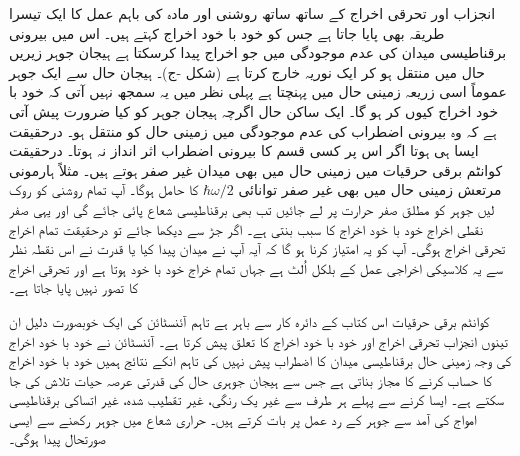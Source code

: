انجزاب اور تحرقی اخراج کے ساتھ ساتھ روشنی اور مادہ کی باہم عمل کا ایک تیسرا طریقہ بھی پایا جاتا ہے جس کو خود با خود اخراج کہتے ہیں۔ اس میں بیرونی برقناطیسی میدان کی عدم موجودگی میں جو اخراج پیدا کرسکتا ہے ہیجان جوہر زیریں حال میں منتقل ہو کر ایک نوریہ خارج کرتا ہے  (شکل -ج)۔ 	ہیجان حال سے ایک جوہر عموماً اسی زریعہ زمینی حال میں پہنچتا ہے پہلی نظر میں یہ سمجھ نہیں آتی کہ خود با خود اخراج کیوں کر ہو گا۔ ایک ساکن حال اگرچہ ہیجان جوہر کو کیا ضرورت پیش آتی ہے کہ وہ بیرونی اضطراب کی عدم موجودگی میں زمینی حال کو منتقل ہو۔ درحقیقت ایسا ہی ہوتا اگر اس پر کسی قسم کا بیرونی اضطراب اثر انداز نہ ہوتا۔ درحقیقت کوانٹم برقی حرقیات میں زمینی حال میں بھی میدان غیر صفر ہوتے ہیں۔ مثلاً ہارمونی مرتعش زمینی حال میں بھی غیر صفر توانائی \(\hbar\omega/2\) کا حامل ہوگا۔ آپ تمام روشنی کو روک لیں جوہر کو مطلق صفر حرارت پر لے جائیں تب بھی برقناطیسی شعاع پائی جائے گی اور یہی صفر نقطی اخراج خود با خود اخراج کا سبب بنتی ہے۔ اگر جڑ سے دیکھا جائے تو درحقیقت تمام اخراج تحرقی اخراج ہوگی۔ آپ کو یہ امتیاز کرنا ہو گا کہ آیہ آپ نے میدان پیدا کیا یا قدرت نے اس نقطہ نظر سے یہ کلاسیکی اخراجی عمل کے بلکل اُلٹ ہے جہاں تمام خراج خود با خود ہوتا ہے اور تحرقی اخراج کا تصور نہیں پایا جاتا ہے۔

کوانٹم برقی حرقیات اس کتاب کے دائرہ کار سے باہر ہے تاہم آئنسٹائن کی ایک خوبصورت دلیل ان تینوں انجزاب تحرقی اخراج اور خود با خود اخراج کا تعلق پیش کرتا ہے۔ آئنسٹائن نے خود با خود اخراج کی وجہ زمینی حال برقناطیسی میدان کا اضطراب پیش نہیں کی تاہم انکے نتائج ہمیں خود با خود اخراج کا حساب کرنے کا مجاز بناتی ہے جس سے ہیجان جوہری حال کی قدرتی عرصہ حیات تلاش کی جا سکتے ہے۔ ایسا کرنے سے پہلے ہر طرف سے غیر یک رنگی، غیر تقطیب شدہ، غیر اتساکی برقناطیسی امواج کی آمد سے جوہر کے رد عمل پر بات کرتے ہیں۔ حراری شعاع میں جوہر رکھنے سے ایسی صورتحال پیدا ہوگی۔

